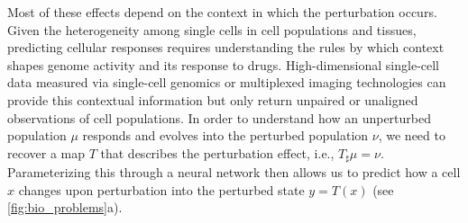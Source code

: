 Most of these effects depend on the context in which the perturbation occurs. Given the heterogeneity among single cells in cell populations and tissues, predicting cellular responses requires understanding the rules by which context shapes genome activity and its response to drugs. High-dimensional single-cell data measured via single-cell genomics or multiplexed imaging technologies can provide this contextual information but only return unpaired or unaligned observations of cell populations.
In order to understand how an unperturbed population $\mu$ responds and evolves into the perturbed population $\nu$, we need to recover a map $T$ that describes the perturbation effect, i.e., $T_\sharp \mu = \nu$. Parameterizing this through a neural network then allows us to predict how a cell $x$ changes upon perturbation into the perturbed state $y= T(x)$ (see \cref{fig:bio_problems}a).



